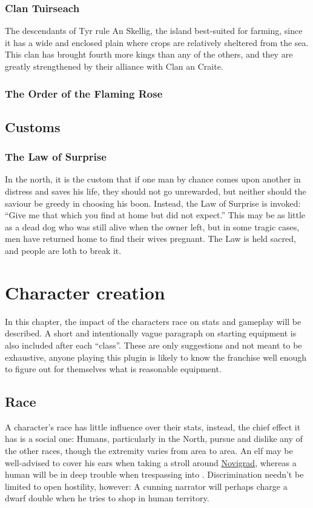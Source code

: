 \documentclass[parskip=full,11pt,%
footheight=38pt]{scrreport}
\begin{document}
\subsection{Clan Tuirseach}
The descendants of Tyr rule An Skellig, the island best-suited for farming, since it has a wide and enclosed plain where crops are relatively sheltered from the
sea. This clan has brought fourth more kings than any of the others, and they are greatly strengthened by their alliance with Clan an Craite.

\subsection{The Order of the Flaming Rose}

\section{Customs}

\subsection{The Law of Surprise}
In the north, it is the custom that if one man by chance comes upon another in distress and saves his life, they should not go unrewarded, but neither
should the saviour be greedy in choosing his boon. Instead, the Law of Surprise is invoked: ``Give me that which you find at home but did not expect.''
This may be as little as a dead dog who was still alive when the owner left, but in some tragic cases, men have returned home to find their wives pregnant.
The Law is held sacred, and people are loth to break it.

\chapter{Character creation}
In this chapter, the impact of the characters race on stats and gameplay will be described. A short and intentionally vague paragraph on starting
equipment is also included after each ``class''. These are only suggestions and not meant to be exhaustive, anyone playing this plugin is likely
to know the franchise well enough to figure out for themselves what is reasonable equipment.

\section{Race}
A character's race has little influence over their stats, instead, the chief effect it has is a social one: Humans, particularly in the North,
pursue and dislike any of the other races, though the extremity varies from area to area. An elf may be well-advised to cover his ears when
taking a stroll around \hyperref[city:novigrad]{Novigrad}, whereas a human will be in deep trouble when trespassing into .
Discrimination needn't be limited to open hostility, however: A cunning narrator will perhaps charge a dwarf double when he tries to shop in
human territory.
\end{document}
